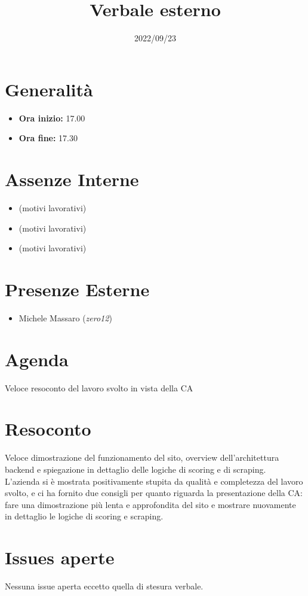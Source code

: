 \documentclass{classes/base}
\title{Verbale esterno}
\date{2022/09/23}
\author{\marcob}
\renewcommand{\maketitle}{
    
}
\begin{document}
    \maketitle

    \section*{Generalità}
    \begin{itemize}
        \item \textbf{Ora inizio:} 17.00
        \item \textbf{Ora fine:} 17.30
    \end{itemize}

    \section*{Assenze Interne}
    \begin{itemize}
    	\item \angela (motivi lavorativi)
        \item \matteo (motivi lavorativi)
        \item \ruth (motivi lavorativi)
    \end{itemize}
    \section*{Presenze Esterne}
    \begin{itemize}
    	\item Michele Massaro (\textit{zero12})
    \end{itemize}

    \section*{Agenda}
    Veloce resoconto del lavoro svolto in vista della CA

    \section*{Resoconto}
    Veloce dimostrazione del funzionamento del sito, overview dell'architettura backend e spiegazione
    in dettaglio delle logiche di scoring e di scraping.\\
    L'azienda si è mostrata positivamente stupita da qualità e completezza del lavoro svolto, e ci ha
    fornito due consigli per quanto riguarda la presentazione della CA: fare una dimostrazione più
    lenta e approfondita del sito e mostrare nuovamente in dettaglio le logiche di scoring e scraping.\\
    
    \section*{Issues aperte}
    Nessuna issue aperta eccetto quella di stesura verbale.
\end{document}
